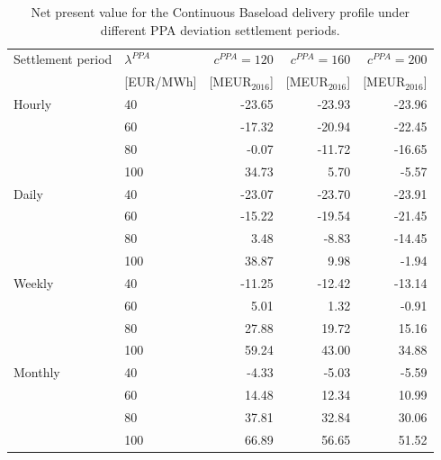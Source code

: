 \begin{table}[H]
\centering
\small
\caption{Net present value for the Continuous Baseload delivery profile under different PPA deviation settlement periods.}
\label{tab:npv_continuous_baseload}
\begin{tabular}{llrrr}
\toprule
Settlement period & $\lambda^{PPA}$ & $c^{PPA}=120$ & $c^{PPA}=160$ & $c^{PPA}=200$ \\
 & [EUR/MWh] & [MEUR$_{2016}$] & [MEUR$_{2016}$] & [MEUR$_{2016}$] \\
\midrule
Hourly & 40 & -23.65 & -23.93 & -23.96 \\
 & 60 & -17.32 & -20.94 & -22.45 \\
 & 80 & -0.07 & -11.72 & -16.65 \\
 & 100 & 34.73 & 5.70 & -5.57 \\
\addlinespace
Daily & 40 & -23.07 & -23.70 & -23.91 \\
 & 60 & -15.22 & -19.54 & -21.45 \\
 & 80 & 3.48 & -8.83 & -14.45 \\
 & 100 & 38.87 & 9.98 & -1.94 \\
\addlinespace
Weekly & 40 & -11.25 & -12.42 & -13.14 \\
 & 60 & 5.01 & 1.32 & -0.91 \\
 & 80 & 27.88 & 19.72 & 15.16 \\
 & 100 & 59.24 & 43.00 & 34.88 \\
\addlinespace
Monthly & 40 & -4.33 & -5.03 & -5.59 \\
 & 60 & 14.48 & 12.34 & 10.99 \\
 & 80 & 37.81 & 32.84 & 30.06 \\
 & 100 & 66.89 & 56.65 & 51.52 \\
\bottomrule
\end{tabular}
\end{table}
